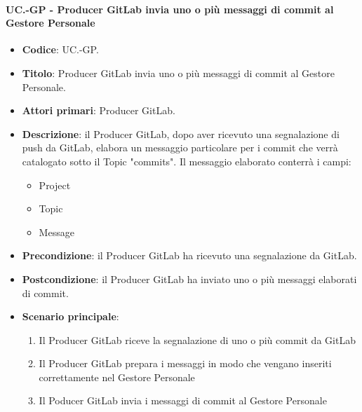 	\paragraph{UC\theuccount.\thesubuccount-GP - Producer GitLab invia uno o più messaggi di commit al Gestore Personale}
		
		\begin{itemize}
			\item \textbf{Codice}: UC\theuccount.\thesubuccount-GP.
			\item \textbf{Titolo}: Producer GitLab invia uno o più messaggi di commit al Gestore Personale.
			\item \textbf{Attori primari}: Producer GitLab.
			\item \textbf{Descrizione}: il Producer GitLab, dopo aver ricevuto una segnalazione di push da  \newline GitLab, elabora un messaggio particolare per i commit che verrà catalogato sotto il Topic "commits".
			Il messaggio elaborato conterrà i campi:
			\begin{itemize}
				\item Project
				\item Topic
				\item Message
			\end{itemize}
			\item \textbf{Precondizione}: il Producer GitLab ha ricevuto una segnalazione da GitLab.
			\item \textbf{Postcondizione}: il Producer GitLab ha inviato uno o più messaggi elaborati di commit.
			\item \textbf{Scenario principale}: 
			\begin{enumerate}
				\item Il Producer GitLab riceve la segnalazione di uno o più commit da GitLab
				\item Il Producer GitLab prepara i messaggi in modo che vengano inseriti correttamente nel Gestore Personale
				\item Il Poducer GitLab invia i messaggi di
				commit al Gestore Personale
			\end{enumerate}
			
		\end{itemize}
		
